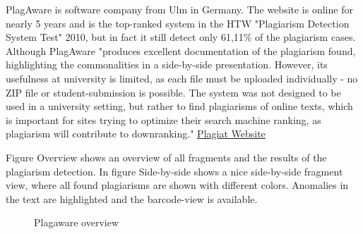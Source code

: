 PlagAware is software company from Ulm in Germany. The website is online for nearly 5 years and is the top-ranked system in the HTW "Plagiarism Detection System Test" 2010, but in fact it still detect only 61,11\% of the plagiarism cases. 
Although PlagAware "produces excellent documentation of the plagiarism found, highlighting the commonalities in a side-by-side presentation. However, its usefulness at university is limited, as each file must be uploaded individually - no ZIP file or student-submission is possible. The system was not designed to be used in a university setting, but rather to find plagiarisms of online texts, which is important for sites trying to optimize their search machine ranking, as plagiarism will contribute to downranking." \href{http://plagiat.htw-berlin.de/software-en/2010-2/s10-05-plagaware/}{Plagiat Website}

Figure Overview shows an overview of all fragments and the results of the plagiarism detection. In figure Side-by-side shows a nice side-by-side fragment view, where all found plagiarisms are shown with different colors. Anomalies in the text are highlighted and the barcode-view is available.
 
 \begin{figure}[!h]
  \centering
  \caption{Plagaware overview}
  \label{fig:plagawareoverview}
\end{figure}


